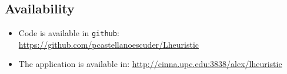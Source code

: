 \subsection{Availability}
\begin{itemize}
	\item Code is available in \texttt{github}:\newline
	\url{https://github.com/pcastellanoescuder/Lheuristic}
	\item The application is available in:\newline
	\url{http://cinna.upc.edu:3838/alex/lheuristic}
	
\end{itemize}
